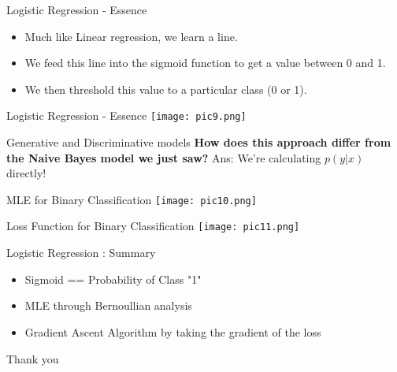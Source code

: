 \documentclass{beamer}
\begin{document}
\begin{frame}{Logistic Regression - Essence}
\begin{itemize}
    \item Much like Linear regression, we learn a line.
    \item We feed this line into the sigmoid function to get a value between 0 and 1.
    \item We then threshold this value to a particular class (0 or 1).
\end{itemize}
\end{frame}

\begin{frame}{Logistic Regression - Essence}
    \texttt{[image: pic9.png]}
\end{frame}

\begin{frame}{Generative and Discriminative models}
    \textbf{How does this approach differ from the Naive Bayes model we just saw?} Ans: We're calculating $p(y|x)$ directly!
\end{frame}

\begin{frame}{MLE for Binary Classification}
    \texttt{[image: pic10.png]}
\end{frame}

\begin{frame}{Loss Function for Binary Classification}
        \texttt{[image: pic11.png]}
\end{frame}

\begin{frame}{Logistic Regression : Summary}
\begin{itemize}
    \item Sigmoid == Probability of Class "1"
    \item MLE through Bernoullian analysis
    \item Gradient Ascent Algorithm by taking the gradient of the loss
\end{itemize}
    
\end{frame}


\begin{frame}
    Thank you
\end{frame}
\end{document}
